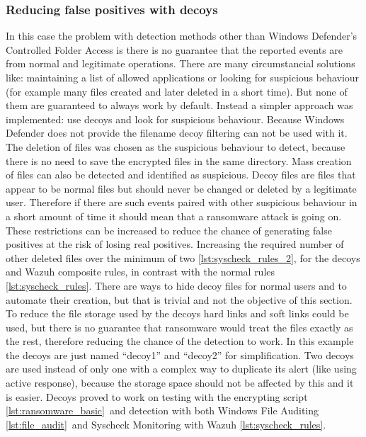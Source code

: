 \subsubsection{Reducing false positives with decoys}
In this case the problem with detection methods other than Windows Defender's Controlled Folder Access is there is no guarantee that the reported events are from normal and legitimate operations.
There are many circumstancial solutions like: maintaining a list of allowed applications or looking for suspicious behaviour (for example many files created and later deleted in a short time).
But none of them are guaranteed to always work by default.
Instead a simpler approach was implemented: use decoys and look for suspicious behaviour.
Because Windows Defender does not provide the filename decoy filtering can not be used with it.
\linej
The deletion of files was chosen as the suspicious behaviour to detect, because there is no need to save the encrypted files in the same directory.
Mass creation of files can also be detected and identified as suspicious.
\linej
\linej
Decoy files are files that appear to be normal files but should never be changed or deleted by a legitimate user.
Therefore if there are such events paired with other suspicious behaviour in a short amount of time it should mean that a ransomware attack is going on.
\linej
These restrictions can be increased to reduce the chance of generating false positives at the risk of losing real positives.
Increasing the required number of other deleted files over the minimum of two \ref{lst:syscheck_rules_2}, for the decoys and Wazuh composite rules, in contrast with the normal rules \ref{lst:syscheck_rules}.
\linej
There are ways to hide decoy files for normal users and to automate their creation, but that is trivial and not the objective of this section.
To reduce the file storage used by the decoys hard links and soft links could be used, but there is no guarantee that ransomware would treat the files exactly as the rest, therefore reducing the chance of the detection to work.
\linej
In this example the decoys are just named ``decoy1'' and ``decoy2'' for simplification.
Two decoys are used instead of only one with a complex way to duplicate its alert (like using active response), because the storage space should not be affected by this and it is easier.
\linej
\linej
Decoys proved to work on testing with the encrypting script \ref{lst:ransomware_basic}\ and detection with both Windows File Auditing \ref{lst:file_audit}\ and Syscheck Monitoring with Wazuh \ref{lst:syscheck_rules}.

